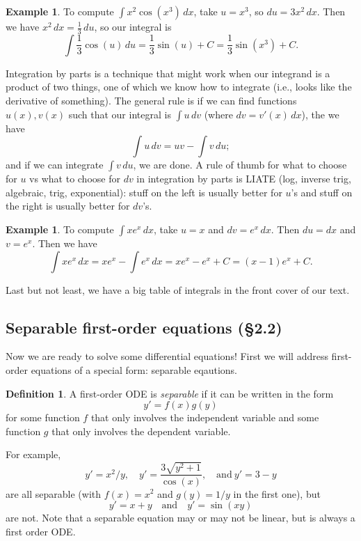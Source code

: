 \documentclass[12pt]{amsart}
\numberwithin{equation}{section}
\theoremstyle{plain} %
\theoremstyle{definition}
\newtheorem{defn}[equation]{Definition}
\newtheorem{ex}[equation]{Example}
\theoremstyle{remark}
\begin{document}
\begin{ex}
To compute $\int x^2 \cos(x^3) \, dx$, take $u=x^3$, so ${du=3x^2 \, dx}$. Then we have ${x^2 \, dx = \frac13 \, du}$, so our integral is \[\int \frac13 \cos(u)\,  du = {\frac13 \sin(u) + C}= \frac13 \sin(x^3) +C.\]
\end{ex}


Integration by parts is a technique that might work when our integrand is a product of two things, one of which we know how to integrate (i.e., looks like the derivative of something). The general rule is if we can find functions $u(x), v(x)$ such that our integral is $\int u \, dv$ (where $dv = v'(x) \, dx$), the we have
\[ \int  u \, dv = uv -  \int v \, du;\]
and if we can integrate $ \int v \, du$, we are done. A rule of thumb for what to choose for $u$ vs what to choose for $dv$ in integration by parts is LIATE (log, inverse trig, algebraic, trig, exponential): stuff on the left is usually better for $u$'s and stuff on the right is usually better for $dv$'s.

\begin{ex}
To compute $\int x e^x \, dx$, take $u=x$ and $dv= e^x \, dx$. Then $du = dx$ and $v=e^x$. Then we have \[\int x e^x \, dx = x e^x - \int e^x \, dx = x e^x - e^x +C = (x-1) e^x +C.\]
\end{ex}

Last but not least, we have a big table of integrals in the front cover of our text. 


\subsection*{Separable first-order equations (\S2.2)} Now we are ready to solve some differential equations! First we will address first-order equations of a special form: separable eqautions.

\begin{defn} A first-order ODE is \emph{separable} if it can be written in the form
\[ y' = f(x) g(y)\]
for some function $f$ that only involves the independent variable and some function $g$ that only involves the dependent variable.
\end{defn}

For example,
\[ y' = x^2/y, \quad y' = \frac{3 \sqrt{y^2+1}}{\cos(x)}, \quad \text{and} \ y' = 3-y \]
are all separable (with $f(x)=x^2$ and $g(y)=1/y$ in the first one), but
\[ y' = x+y \quad \text{and} \quad y'=\sin(xy) \]
are not. Note that a separable equation may or may not be linear, but is always a first order ODE.
\end{document}
